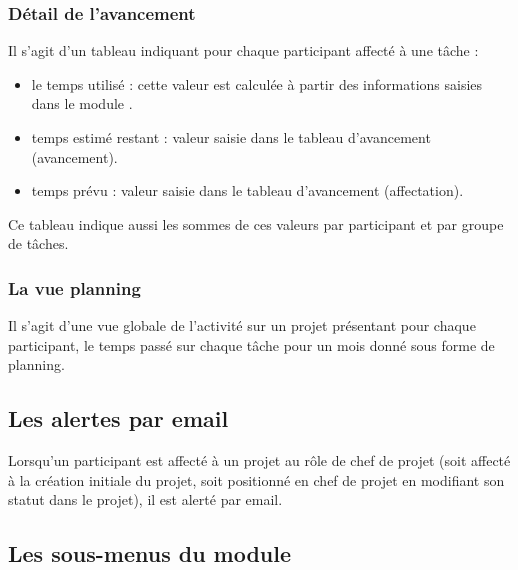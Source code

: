 \subsubsection{Détail de l'avancement}

Il s'agit d'un tableau indiquant pour chaque participant affecté à une tâche :

\begin{itemize}
\item le temps utilisé : cette valeur est calculée à partir des informations saisies dans le module \timemanager.
\item temps estimé restant : valeur saisie dans le tableau d'avancement (avancement).
\item temps prévu : valeur saisie dans le tableau d'avancement (affectation).
\end{itemize}

Ce tableau indique aussi les sommes de ces valeurs par participant et par groupe de tâches.

\subsubsection{La vue planning}

Il s'agit d'une vue globale de l'activité sur un projet présentant pour chaque participant, le temps passé sur chaque tâche pour un mois donné sous forme de planning.


 

\subsection{Les alertes par email}

Lorsqu'un participant est affecté à un projet au rôle de chef de projet (soit affecté à la création initiale du projet, soit positionné en chef de projet en modifiant son statut dans le projet), il est alerté par email.


\subsection{Les sous-menus du module \project}

